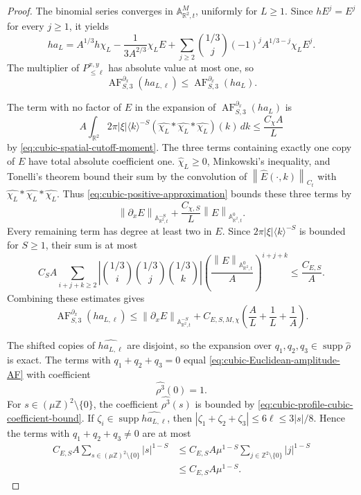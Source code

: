 \documentclass[12pt,reqno,letterpaper]{amsart}
\numberwithin{equation}{section}
\theoremstyle{definition}
\newcommand{\R}{\mathbb R}
\newcommand{\Z}{\mathbb Z}
\newcommand{\A}{\mathbb A}
\newcommand{\supp}{\operatorname{supp}}
\newcommand{\norm}[1]{\left\lVert #1\right\rVert}
\newcommand{\abs}[1]{\left\lvert #1\right\rvert}
\begin{document}
\begin{proof}
The binomial series converges in $\A^M_{\R^2,t}$, uniformly for $L\geq1$.
Since $hE^j=E^j$ for every $j\geq1$, it yields
\begin{equation}\label{eq:cubic-Euclidean-amplitude-series}
 h a_L=A^{1/3}h\chi_L-\frac1{3A^{2/3}}\chi_LE
 +\sum_{j\geq2}\binom{1/3}{j}(-1)^j
       A^{1/3-j}\chi_LE^j.
\end{equation}
The multiplier of $P_{\leq\ell}^{x,y}$ has absolute value at most one, so
\[
 \operatorname{AF}^{\partial_x}_{S,3}(h a_{L,\ell})
 \leq \operatorname{AF}^{\partial_x}_{S,3}(h a_L).
\]

The term with no factor of $E$ in the expansion of
$\operatorname{AF}^{\partial_x}_{S,3}(h a_L)$ is
\[
 A\int_{\R^2}2\pi\abs\xi\langle k\rangle^{-S}
 (\widehat{\chi_L}*\widehat{\chi_L}*\widehat{\chi_L})(k)\,dk
 \leq\frac{C_\chi A}{L}
\]
by \eqref{eq:cubic-spatial-cutoff-moment}.  The three terms containing
exactly one copy of $E$ have total absolute coefficient one.
$\widehat\chi_L\geq0$, Minkowski's inequality, and Tonelli's
theorem bound their sum by the convolution of
$\norm{\widehat E(\cdot,k)}_{C_t}$ with
$\widehat{\chi_L}*\widehat{\chi_L}*\widehat{\chi_L}$.  Thus
\eqref{eq:cubic-positive-approximation} bounds these three terms by
\[
 \norm{\partial_xE}_{\A^{-S}_{\R^2,t}}
 +\frac{C_{\chi,S}}L\norm E_{\A^0_{\R^2,t}}.
\]
Every remaining term has degree at least two in $E$.  Since
$2\pi\abs\xi\langle k\rangle^{-S}$ is bounded for $S\geq1$, their
sum is at most
\[
 C_SA\sum_{i+j+k\geq2}
 \abs{\binom{1/3}{i}\binom{1/3}{j}\binom{1/3}{k}}
 \left(\frac{\norm E_{\A^0_{\R^2,t}}}{A}\right)^{i+j+k}
 \leq\frac{C_{E,S}}A.
\]
Combining these estimates gives
\begin{equation}\label{eq:cubic-Euclidean-amplitude-AF}
 \operatorname{AF}^{\partial_x}_{S,3}(h a_{L,\ell})
 \leq\norm{\partial_xE}_{\A^{-S}_{\R^2,t}}
 +C_{E,S,M,\chi}\left(\frac AL+\frac1L+\frac1A\right).
\end{equation}

The shifted copies of $\widehat{h a_{L,\ell}}$ are disjoint, so the
expansion over $q_1,q_2,q_3\in\supp\widehat\rho$ is exact.
The terms with $q_1+q_2+q_3=0$ equal
\eqref{eq:cubic-Euclidean-amplitude-AF} with coefficient
\[
 \widehat{\rho^3}(0)=1.
\]
For $s\in(\mu\Z)^2\setminus\{0\}$, the coefficient
$\widehat{\rho^3}(s)$ is bounded by
\eqref{eq:cubic-profile-cubic-coefficient-bound}.  If
$\zeta_i\in\supp\widehat{h a_{L,\ell}}$, then
$\abs{\zeta_1+\zeta_2+\zeta_3}\leq6\ell\leq3\abs s/8$.
Hence the terms with $q_1+q_2+q_3\neq0$ are at most
\begin{align*}
 C_{E,S}A\sum_{s\in(\mu\Z)^2\setminus\{0\}}\abs s^{1-S}
 &\leq C_{E,S}A\mu^{1-S}
 \sum_{j\in\Z^2\setminus\{0\}}\abs j^{1-S}\\
 &\leq C_{E,S}A\mu^{1-S}.
\end{align*}


\end{proof}
\end{document}
